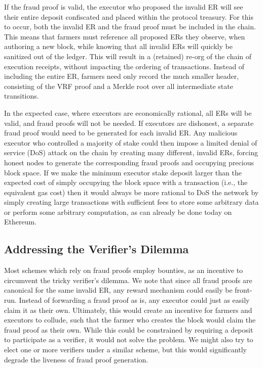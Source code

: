 \documentclass[conference]{IEEEtran}
\begin{document}
If the fraud proof is valid, the executor who proposed the invalid ER will see their entire deposit confiscated and placed within the protocol treasury. For this to occur, both the invalid ER and the fraud proof must be included in the chain. This means that farmers must reference all proposed ERs they observe, when authoring a new block, while knowing that all invalid ERs will quickly be sanitized out of the ledger. This will result in a (retained) re-org of the chain of execution receipts, without impacting the ordering of transactions. Instead of including the entire ER, farmers need only record the much smaller header, consisting of the VRF proof and a Merkle root over all intermediate state transitions.

In the expected case, where executors are economically rational, all ERs will be valid, and fraud proofs will not be needed. If executors are dishonest, a separate fraud proof would need to be generated for each invalid ER. Any malicious executor who controlled a majority of stake could then impose a limited denial of service (DoS) attack on the chain by creating many different, invalid ERs, forcing honest nodes to generate the corresponding fraud proofs and occupying precious block space. If we make the minimum executor stake deposit larger than the expected cost of simply occupying the block space with a transaction (i.e., the equivalent gas cost) then it would always be more rational to DoS the network by simply creating large transactions with sufficient fees to store some arbitrary data or perform some arbitrary computation, as can already be done today on Ethereum. 

\subsection{Addressing the Verifier's Dilemma}

Most schemes which rely on fraud proofs employ bounties, as an incentive to circumvent the tricky verifier’s dilemma. We note that since all fraud proofs are canonical for the same invalid ER, any reward mechanism could easily be front-run. Instead of forwarding a fraud proof as is, any executor could just as easily claim it as their own. Ultimately, this would create an incentive for farmers and executors to collude, such that the farmer who creates the block would claim the fraud proof as their own. While this could be constrained by requiring a deposit to participate as a verifier, it would not solve the problem. We might also try to elect one or more verifiers under a similar scheme, but this would significantly degrade the liveness of fraud proof generation.
\end{document}
